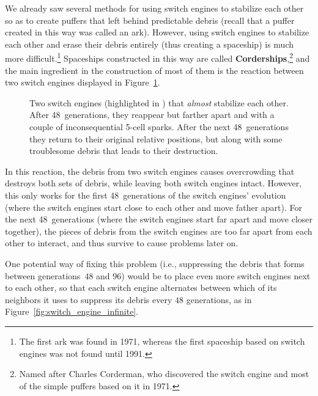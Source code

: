 We already saw several methods for using switch engines to stabilize each other so as to create puffers that left behind predictable debris (recall that a puffer created in this way was called an ark). However, using switch engines to stabilize each other and erase their debris entirely (thus creating a spaceship) is much more difficult.\footnote{The first ark was found in 1971, whereas the first spaceship based on switch engines was not found until 1991.} Spaceships constructed in this way are called \textbf{Corderships},\footnote{Named after Charles Corderman, who discovered the switch engine and most of the simple puffers based on it in 1971.} and the main ingredient in the construction of most of them is the reaction between two switch engines displayed in Figure~\ref{fig:switch_engine_48}.

\begin{figure}[!htb]
	\centering{}
	\caption{Two switch engines (highlighted in ) that \emph{almost} stabilize each other. After 48~generations, they reappear but farther apart and with a couple of inconsequential 5-cell sparks. After the next 48~generations they return to their original relative positions, but along with some troublesome debris that leads to their destruction.}\label{fig:switch_engine_48}
\end{figure}

In this reaction, the debris from two switch engines causes overcrowding that destroys both sets of debris, while leaving both switch engines intact. However, this only works for the first 48~generations of the switch engines' evolution (where the switch engines start close to each other and move father apart). For the next 48~generations (where the switch engines start far apart and move closer together), the pieces of debris from the switch engines are too far apart from each other to interact, and thus survive to cause problems later on.

One potential way of fixing this problem (i.e., suppressing the debris that forms between generations~$48$ and $96$) would be to place even more switch engines next to each other, so that each switch engine alternates between which of its neighbors it uses to suppress its debris every $48$ generations, as in Figure~\ref{fig:switch_engine_infinite}.

